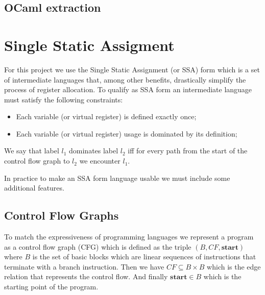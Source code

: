 \subsection{OCaml extraction}

\section{Single Static Assigment}
\label{sec:ssa}
For this project we use the Single Static Assignment (or SSA) form which is a set of intermediate languages that, among other benefits, drastically simplify the process of register allocation.
To qualify as SSA form an intermediate language must satisfy the following constraints:
\begin{itemize}
    \item Each variable (or virtual register) is defined exactly once;
    \item Each variable (or virtual register) usage is dominated by its definition;
\end{itemize}
We say that label $l_1$ dominates label $l_2$ iff for every path from the start of the control flow graph to $l_2$ we encounter $l_1$.

In practice to make an SSA form language usable we must include some additional features.

\subsection{Control Flow Graphs}
To match the expressiveness of programming languages we represent a program as a control flow graph (CFG) which is defined as the triple $(B, CF, \textbf{start})$ where $B$ is the set of basic blocks which are linear sequences of instructions that terminate with a branch instruction. Then we have $CF \subseteq B \times B$ which is the edge relation that represents the control flow. And finally $\textbf{start} \in B$ which is the starting point of the program.


